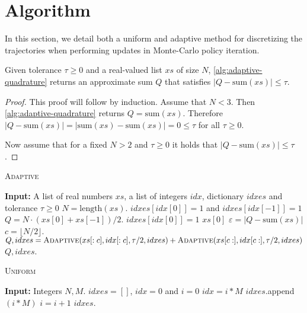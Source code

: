 \section{Algorithm}
In this section, we detail both a uniform and adaptive method for discretizing the trajectories when performing updates in Monte-Carlo policy iteration. 
\begin{proposition}
    Given tolerance $\tau \geq 0$ and a real-valued list $xs$ of size $N$, \cref{alg:adaptive-quadrature} returns an approximate sum $Q$ that satisfies $|Q - \text{sum}(xs)| \leq \tau$.  
\end{proposition}
\begin{proof}
    This proof will follow by induction. Assume that $N < 3$. Then \cref{alg:adaptive-quadrature} returns $Q = \text{sum}(xs)$. Therefore $|Q - \text{sum}(xs)| = |\text{sum}(xs) - \text{sum}(xs)| = 0 \leq \tau$ for all $\tau \geq 0$. 
    
    Now assume that for a fixed $N > 2$ and $\tau \geq 0$ it holds that $|Q - \text{sum}(xs)| \leq \tau$. 
\end{proof}

\begin{algorithm}[t]
    \caption{\textsc{Adaptive}}\label{alg:adaptive-quadrature}
    \begin{algorithmic}
    \State \textbf{Input:} A list of real numbers $xs$, a list of integers $idx$, dictionary $idxes$ and tolerance $\tau \geq 0$
    \State $N = \text{length}(xs)$.
        \State $idxes[idx[0]] = 1$ and $idxes[idx[-1]] = 1$
        \State $Q = N \cdot (xs[0] + xs[-1]) / 2$.
    \Else
        \State $idxes[idx[0]] =1$
        \State \Return $xs[0]$
    \EndIf
    \State $\varepsilon = |Q - \text{sum}(xs)|$
    \If{$\varepsilon \geq \tau$}
        \State $c = \lfloor N / 2 \rfloor$.
        \State $Q, idxes = \textsc{Adaptive}(xs[:c], idx[:c], \tau /2, idxes) + \textsc{Adaptive}(xs[c:], idx[c:], \tau /2, idxes)$
    \EndIf
    \State \Return $Q, idxes$.
    \end{algorithmic}
    \end{algorithm}


    \begin{algorithm}[t]
        \caption{\textsc{Uniform}}\label{alg:uniform}
        \begin{algorithmic}
        \State \textbf{Input:} Integers $N,M$.
        \State $idxes = []$, $idx = 0$ and $i=0$
        \State $idx = i * M$
        \State $idxes.$append$(i * M)$
        \State $i = i + 1$
        \EndWhile
        \State \Return $idxes$.
        \end{algorithmic}
        \end{algorithm}



